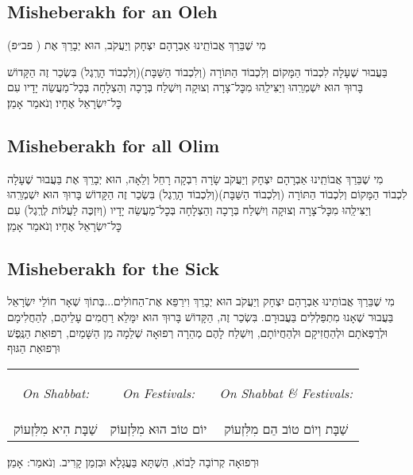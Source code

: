 \documentclass[11pt, openany]{article}
\newcommand{\rashi}[1]{%
		\textsf{#1}}
\newcommand{\eng}[1]{\begin{english}\beginL #1 \endL\end{english}}
\newcommand{\enginline}[1]{
\begin{large}
	\eng{\textit{#1}}
\end{large}
}
\newcommand{\ploni}{(\rashi{פב״פ})
}
\begin{document}
\begin{minipage}{\textwidth}
\eng{\section*{Misheberakh for an Oleh}}

\begin{large}
מִי שֶׁבֵּרַךְ אֲבוֹתֵֽינוּ אַבְרָהָם יִצְחָק וְיַעֲקֹב, הוּא יְבָרֵךְ אֶת
\ploni
בַּעֲבוּר שֶׁעָלָה לִכְבוֹד הַמָּקוֹם וְלִכְבוֹד הַתּוֹרָה (וְלִכְבוֹד הַשַּׁבָּת)(וְלִכְבוֹד הָרֶֽגֶל) בִּשְׂכַר זֶה הַקָּדוֹשׁ בָּרוּךְ הוּא יִשְׁמְרֵֽהוּ וְיַצִּילֵֽהוּ מִכׇּל־צָרָה וְצוּקָה וְיִשְׁלַח בְּרָכָה וְהַצְלָחָה בְּכׇל־מַעֲשֵׂה יָדָיו עִם כׇּל־יִשְׂרָאֵל אֶחָיו׃ וְנֹאמַר אָמֵן׃\end{large}
\end{minipage}
\begin{minipage}{\textwidth}
\eng{\section*{Misheberakh for all Olim}}

\begin{large}
מִי שֶׁבֵּרַךְ אֲבוֹתֵֽינוּ אַבְרָהָם יִצְחָק וְיַעֲקֹב שָׂרָה רִבְקָה רָחֵל וְלֵאָה, הוּא יְבָרֵךְ אֶת
בַּעֲבוּר שֶׁעָלָה לִכְבוֹד הַמָּקוֹם וְלִכְבוֹד הַתּוֹרָה (וְלִכְבוֹד הַשַּׁבָּת)(וְלִכְבוֹד הָרֶֽגֶל)
בִּשְׂכַר זֶה הַקָּדוֹשׁ בָּרוּךְ הוּא יִשְׁמְרֵֽהוּ וְיַצִּילֵֽהוּ מִכׇּל־צָרָה וְצוּקָה וְיִשְׁלַח בְּרָכָה וְהַצְלָחָה בְּכׇל־מַעֲשֵׂה יָדָיו (וְיִזְכֶּה לַעֲלוֹת לְרֶֽגֶל) עִם כׇּל־יִשְׂרָאֵל אֶחָיו׃ וְנֹאמַר אָמֵן׃
\end{large}\end{minipage}

\begin{minipage}{\textwidth}
\eng{\section*{Misheberakh for the Sick}}

\begin{large}
מִי שֶׁבֵּרַךְ אֲבוֹתֵינוּ אַבְרָהָם יִצְחָק וְיַעֲקֹב הוּא יְבָרֵךְ וִירַפֵּא אֶת־הַחוׂלִים...בְּתוֹךְ שְׁאָר חוֹלֵי יִשְׂרָאֵל בַּעֲבוּר שֶׁאָנוּ מִתְפַּלְלִים בַּעֲבוּרָם. בִּשְׂכַר זֶה, הַקָּדוֹשׁ בָּרוּךְ הוּא יִמָּלֵא רַחֲמִים עָלֵיהֶם, לְהַחֲלִימָם וּלְרַפְּאֹתָם וּלְהַחֲזִיקָם וּלְהַחֲיוֹתָם, וְיִשְׁלַח לָהֶם מְהֵרָה רְפוּאָה שְׁלֵמָה מִן הַשָּׁמַיִם, רְפוּאַת הַנֶּֽפֶשׁ וּרְפוּאַת הַגּוּף 

\begin{tabular}{c | c | c}
	\enginline{On Shabbat:}&\enginline{On Festivals:}&\enginline{On Shabbat \& Festivals:}\\
	‏שַׁבָּת הִיא מִלִּזְעוֹק & יוֹם טוֹב הוּא מִלִּזְעוֹק & שַׁבָּת וְיוֹם טוֹב הֵם מִלִּזְעוֹק\\
	\end{tabular}

 וּרְפוּאָה קְרוֹבָה לָבוֹא, הַשְׁתָּא בַּעֲגָלָא וּבִזְמַן קָרִיב. וְנֹאמַר: אָמֵן׃
 \end{large}\end{minipage}
\end{document}
